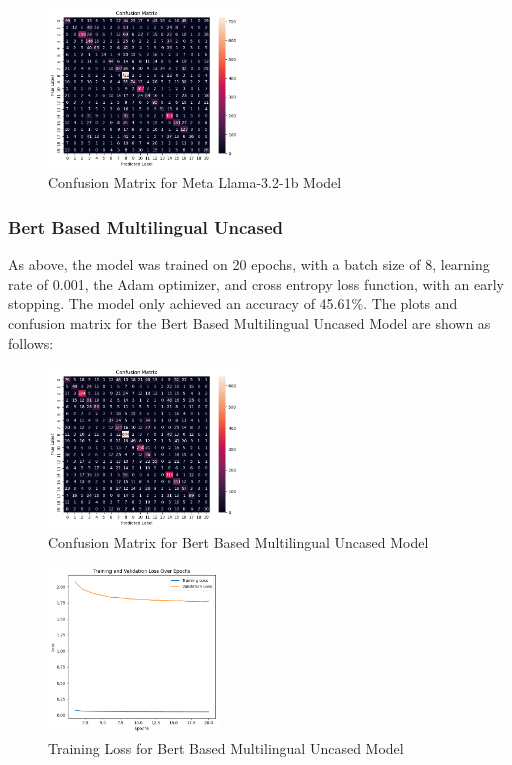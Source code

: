 \begin{figure}[H]
    \centering
    \includegraphics[width=0.45\textwidth]{llama_confmat.png}
    \caption{Confusion Matrix for Meta Llama-3.2-1b Model}
    \label{fig:llama_confmat}
\end{figure}

\subsubsection{Bert Based Multilingual Uncased}
As above, the model was trained on 20 epochs, with a batch size of 8, learning rate of 0.001, the Adam optimizer, and cross entropy loss function, with an early stopping. The model only achieved an accuracy of 45.61\%. The plots and confusion matrix for the Bert Based Multilingual Uncased Model are shown as follows:

\begin{figure}[H]
    \centering
    \includegraphics[width=0.45\textwidth]{bbmu_confmat.png}
    \caption{Confusion Matrix for Bert Based Multilingual Uncased Model}
    \label{fig:bbmu_confmat}
\end{figure}

\begin{figure}[H]
    \centering
    \includegraphics[width=0.4\textwidth]{bbmu_trainloss.png}
    \caption{Training Loss for Bert Based Multilingual Uncased Model}
    \label{fig:bbmu_trainloss}
\end{figure}

